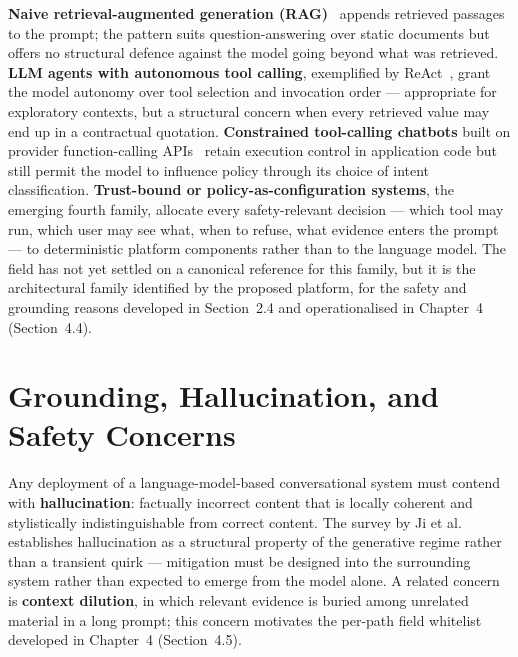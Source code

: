\textbf{Naive retrieval-augmented generation (RAG)}~\cite{lewis2020rag} appends retrieved passages to the prompt; the pattern suits question-answering over static documents but offers no structural defence against the model going beyond what was retrieved. \textbf{LLM agents with autonomous tool calling}, exemplified by ReAct~\cite{yao2023react}, grant the model autonomy over tool selection and invocation order --- appropriate for exploratory contexts, but a structural concern when every retrieved value may end up in a contractual quotation. \textbf{Constrained tool-calling chatbots} built on provider function-calling APIs~\cite{anthropic_tool_use_docs} retain execution control in application code but still permit the model to influence policy through its choice of intent classification. \textbf{Trust-bound or policy-as-configuration systems}, the emerging fourth family, allocate every safety-relevant decision --- which tool may run, which user may see what, when to refuse, what evidence enters the prompt --- to deterministic platform components rather than to the language model. The field has not yet settled on a canonical reference for this family, but it is the architectural family identified by the proposed platform, for the safety and grounding reasons developed in Section~2.4 and operationalised in Chapter~4 (Section~4.4).

\section{Grounding, Hallucination, and Safety Concerns}
Any deployment of a language-model-based conversational system must contend with \textbf{hallucination}: factually incorrect content that is locally coherent and stylistically indistinguishable from correct content. The survey by Ji et al.~\cite{ji2023hallucination} establishes hallucination as a structural property of the generative regime rather than a transient quirk --- mitigation must be designed into the surrounding system rather than expected to emerge from the model alone. A related concern is \textbf{context dilution}, in which relevant evidence is buried among unrelated material in a long prompt; this concern motivates the per-path field whitelist developed in Chapter~4 (Section~4.5).

